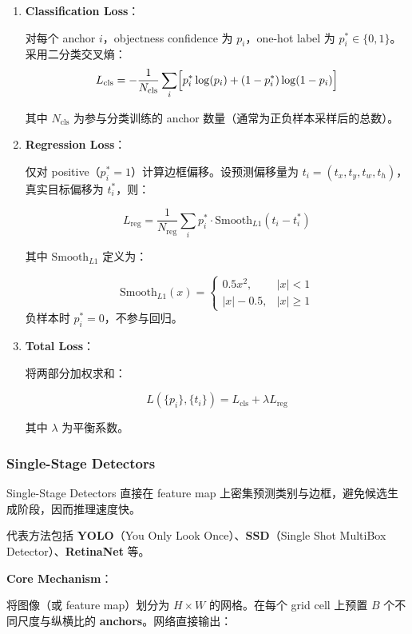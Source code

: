 \begin{enumerate}
\def\labelenumi{\arabic{enumi}.}
\item
  \textbf{Classification Loss}：

  对每个 anchor \(i\)，objectness confidence 为 \(p_i\)，one-hot label
  为 \(p_i^* \in \{0, 1\}\)。采用二分类交叉熵： \[
   L_{\text{cls}} = -\frac{1}{N_{\text{cls}}} \sum_i \Bigl[ p_i^* \log(p_i) + (1-p_i^*) \log(1-p_i) \Bigr]
   \]

  其中 \(N_{\text{cls}}\) 为参与分类训练的 anchor
  数量（通常为正负样本采样后的总数）。
\item
  \textbf{Regression Loss}：

  仅对 positive（\(p_i^* = 1\)）计算边框偏移。设预测偏移量为
  \(t_i = (t_x, t_y, t_w, t_h)\)，真实目标偏移为 \(t_i^*\)，则：

  \[
   L_{\text{reg}} = \frac{1}{N_{\text{reg}}} \sum_i p_i^* \cdot \text{Smooth}_{L1}(t_i - t_i^*)
   \]

  其中 \(\text{Smooth}_{L1}\) 定义为：

  \[
   \text{Smooth}_{L1}(x) =
   \begin{cases}
   0.5 x^2, & |x| < 1 \\[6pt]
   |x| - 0.5, & |x| \geq 1
   \end{cases}
   \] 负样本时 \(p_i^*=0\)，不参与回归。
\item
  \textbf{Total Loss}：

  将两部分加权求和：

  \[
   L(\{p_i\}, \{t_i\}) = L_{\text{cls}} + \lambda L_{\text{reg}}
   \]

  其中 \(\lambda\) 为平衡系数。
\end{enumerate}

\subsubsection{Single-Stage Detectors}\label{single-stage-detectors}

Single-Stage Detectors 直接在 feature map
上密集预测类别与边框，避免候选生成阶段，因而推理速度快。

代表方法包括 \textbf{YOLO}（You Only Look Once）、\textbf{SSD}（Single
Shot MultiBox Detector）、\textbf{RetinaNet} 等。

\textbf{Core Mechanism}：

将图像（或 feature map）划分为 \(H \times W\) 的网格。在每个 grid cell
上预置 \(B\) 个不同尺度与纵横比的 \textbf{anchors}。网络直接输出：

